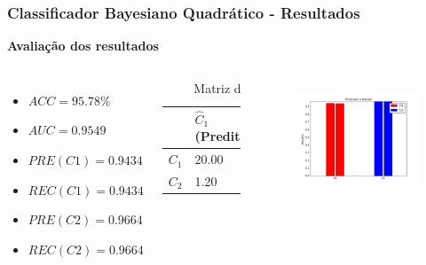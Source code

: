 \documentclass{beamer}
\begin{document}
\begin{frame}
\frametitle{Classificador Bayesiano Quadrático - Resultados}

\textbf{Avaliação dos resultados}
\begin{columns}[c] 
\begin{itemize}
\item $ACC = 95.78 \%$
\item $AUC = 0.9549 $

\item $PRE(C1) = 0.9434$
\item $REC(C1) = 0.9434$
\item $PRE(C2) = 0.9664$
\item $REC(C2) = 0.9664$
\end{itemize}

\begin{table}
\begin{tabular}{l l l}
\toprule
 & \textbf{$\hat{C}_1$ (Predita)} & \textbf{$\hat{C}_2$(Predita)}\\
\midrule
$C_1$ & 20.00&1.20\\ 
$C_2$ &  1.20&34.50\\ 

\bottomrule
\end{tabular}
\caption{Matriz de confusão}
\end{table}


\begin{figure}[H]
\centering
  \includegraphics[width=\linewidth]{../img/quad_bayes_rec.png}
  \label{fig:percep}
\end{figure}%

\end{columns}

\end{frame}
\end{document}
